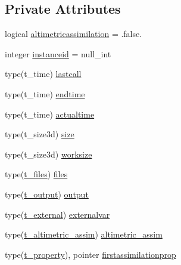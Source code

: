 \subsection*{Private Attributes}
\begin{DoxyCompactItemize}
\item 
logical \mbox{\hyperlink{structmoduleassimilation_1_1t__assimilation_a3cecf0ead82f9a2c82307269a607f731}{altimetricassimilation}} = .false.
\item 
integer \mbox{\hyperlink{structmoduleassimilation_1_1t__assimilation_ad96087a20806849511a7db4f09d2fbed}{instanceid}} = null\+\_\+int
\item 
type(t\+\_\+time) \mbox{\hyperlink{structmoduleassimilation_1_1t__assimilation_a9c746cc93e613ee9da2e2e86fb1099be}{lastcall}}
\item 
type(t\+\_\+time) \mbox{\hyperlink{structmoduleassimilation_1_1t__assimilation_a61d01c90265b4534d8fa0402aa372449}{endtime}}
\item 
type(t\+\_\+time) \mbox{\hyperlink{structmoduleassimilation_1_1t__assimilation_a6586968649f2f6f5b4ebd8c1bbba95ec}{actualtime}}
\item 
type(t\+\_\+size3d) \mbox{\hyperlink{structmoduleassimilation_1_1t__assimilation_a2f692ba76b1f31f17e872fabf4ab34b9}{size}}
\item 
type(t\+\_\+size3d) \mbox{\hyperlink{structmoduleassimilation_1_1t__assimilation_aecb77a5309099cd24cc6fd85fd2a8bdf}{worksize}}
\item 
type(\mbox{\hyperlink{structmoduleassimilation_1_1t__files}{t\+\_\+files}}) \mbox{\hyperlink{structmoduleassimilation_1_1t__assimilation_a4139c62474b80327feebfa4b343de7c2}{files}}
\item 
type(\mbox{\hyperlink{structmoduleassimilation_1_1t__output}{t\+\_\+output}}) \mbox{\hyperlink{structmoduleassimilation_1_1t__assimilation_ac4425502d1f806ea11093902edd8a233}{output}}
\item 
type(\mbox{\hyperlink{structmoduleassimilation_1_1t__external}{t\+\_\+external}}) \mbox{\hyperlink{structmoduleassimilation_1_1t__assimilation_a979ca2ae5534f69530e2ee921e0bfd61}{externalvar}}
\item 
type(\mbox{\hyperlink{structmoduleassimilation_1_1t__altimetric__assim}{t\+\_\+altimetric\+\_\+assim}}) \mbox{\hyperlink{structmoduleassimilation_1_1t__assimilation_a9215eb5b653391f9ce20443d7008f565}{altimetric\+\_\+assim}}
\item 
type(\mbox{\hyperlink{structmoduleassimilation_1_1t__property}{t\+\_\+property}}), pointer \mbox{\hyperlink{structmoduleassimilation_1_1t__assimilation_aae69109593c6df05b14adff6f0b27f77}{firstassimilationprop}}

\end{DoxyCompactItemize}

